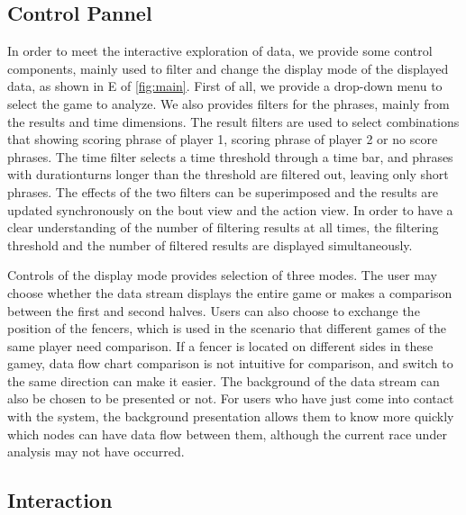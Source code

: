 \documentclass[journal]{vgtc}                %
\begin{document}
\subsection{Control Pannel}
In order to meet the interactive exploration of data, we provide some control components, mainly used to filter and change the display mode of the displayed data, as shown in E of \autoref{fig:main}.
First of all, we provide a drop-down menu to select the game to analyze.
We also provides filters for the phrases, mainly from the results and time dimensions.
The result filters are used to select combinations that showing scoring phrase of player 1, scoring phrase of player 2 or no score phrases.
The time filter selects a time threshold through a time bar, and phrases with durationturns longer than the threshold are filtered out, leaving only short phrases.
The effects of the two filters can be superimposed and the results are updated synchronously on the bout view and the action view.
In order to have a clear understanding of the number of filtering results at all times, the filtering threshold and the number of filtered results are displayed simultaneously.

Controls of the display mode provides selection of three modes.
The user may choose whether the data stream displays the entire game or makes a comparison between the first and second halves.
Users can also choose to exchange the position of the fencers, which is used in the scenario that  different games of the same player need comparison. If a fencer is located on different sides in these gamey, data flow chart comparison is not intuitive for comparison, and switch to the same direction can make it easier.
The background of the data stream can also be chosen to be presented or not.
For users who have just come into contact with the system, the background presentation allows them to know more quickly which nodes can have data flow between them, although the current race under analysis may not have occurred.

	
	
\subsection{Interaction}
\end{document}
